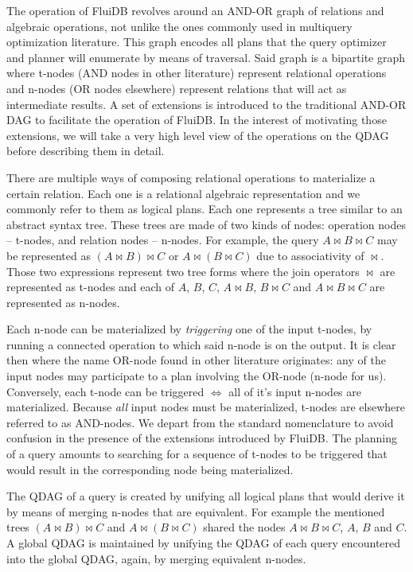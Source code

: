 The operation of FluiDB revolves around an AND-OR graph of relations
and algebraic operations, not unlike the ones commonly used in
multiquery optimization literature. This graph encodes all plans that
the query optimizer and planner will enumerate by means of
traversal. Said graph is a bipartite graph where t-nodes (AND nodes in
other literature) represent relational operations and n-nodes (OR
nodes elsewhere) represent relations that will act as intermediate
results.  A set of extensions is introduced to the traditional AND-OR
DAG to facilitate the operation of FluiDB. In the interest of
motivating those extensions, we will take a very high level view of
the operations on the QDAG before describing them in detail.

There are multiple ways of composing relational operations to
materialize a certain relation. Each one is a relational algebraic
representation and we commonly refer to them as logical plans. Each
one represents a tree similar to an abstract syntax tree. These trees
are made of two kinds of nodes: operation nodes -- t-nodes, and
relation nodes -- n-nodes. For example, the query \(A \Join B \Join
C\) may be represented as \((A \Join B) \Join C\) or \(A \Join (B
\Join C)\) due to associativity of \(\Join\). Those two expressions
represent two tree forms where the join operators \(\Join\) are
represented as t-nodes and each of \(A\), \(B\), \(C\), \(A \Join B\),
\(B \Join C\) and \(A \Join B \Join C\) are represented as n-nodes.

Each n-node can be materialized by \emph{triggering} one of the input
t-nodes, by running a connected operation to which said n-node is on
the output. It is clear then where the name OR-node found in other
literature originates: any of the input nodes may participate to a
plan involving the OR-node (n-node for us). Conversely, each t-node
can be triggered \(\iff\) all of it's input n-nodes are
materialized. Because \emph{all} input nodes must be materialized,
t-nodes are elsewhere referred to as AND-nodes. We depart from the
standard nomenclature to avoid confusion in the presence of the
extensions introduced by FluiDB. The planning of a query amounts to
searching for a sequence of t-nodes to be triggered that would result
in the corresponding node being materialized.

The QDAG of a query is created by unifying all logical plans that
would derive it by means of merging n-nodes that are equivalent. For
example the mentioned trees \((A \Join B) \Join C\) and \(A \Join (B
\Join C)\) shared the nodes \(A \Join B \Join C\), \(A\), \(B\) and
\(C\). A global QDAG is maintained by unifying the QDAG of each query
encountered into the global QDAG, again, by merging equivalent
n-nodes.


